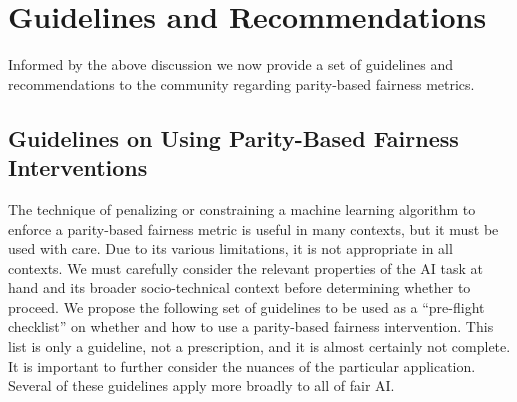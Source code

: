 \documentclass[11pt,dvipdfm]{article}
\begin{document}






\section{Guidelines and Recommendations}

Informed by the above discussion we now provide a set of guidelines and recommendations to the community regarding parity-based fairness metrics.

\subsection{Guidelines on Using Parity-Based Fairness Interventions}

The technique of penalizing or constraining a machine learning algorithm to enforce a parity-based fairness metric is useful in many contexts, but it must be used with care.  Due to its various limitations, it is not appropriate in all contexts.  We must carefully consider the relevant properties of the AI task at hand and its broader socio-technical context before determining whether to proceed.  We propose the following set of guidelines to be used as a ``pre-flight checklist'' on whether and how to use a parity-based fairness intervention.  This list is only a guideline, not a prescription, and it is almost certainly not complete. It is important to further consider the nuances of the particular application.  Several of these guidelines apply more broadly to all of fair AI. 
 
\end{document}
